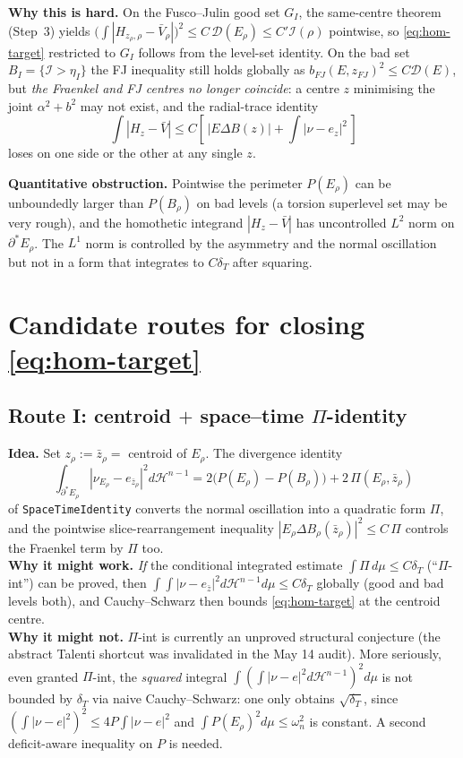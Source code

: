\documentclass[11pt]{article}
\theoremstyle{definition}
\newcommand{\Hn}{\mathcal H^{n-1}}
\newcommand{\dD}{\mathcal D}
\begin{document}
\textbf{Why this is hard.}  On the Fusco--Julin good set $G_{I}$, the
same-centre theorem (Step~3) yields
$\bigl(\int|H_{z_{\rho},\rho}-\bar V_{\rho}|\bigr)^{2}\le C\,\dD(E_{\rho})\le C'\mathcal I(\rho)$
pointwise, so \eqref{eq:hom-target} restricted to $G_{I}$ follows from
the level-set identity.  On the bad set
$B_{I}=\{\mathcal I>\eta_{I}\}$ the FJ inequality still holds
globally as $b_{FJ}(E,z_{FJ})^{2}\le C\dD(E)$, but \emph{the
Fraenkel and FJ centres no longer coincide}: a centre $z$ minimising
the joint $\alpha^{2}+b^{2}$ may not exist, and the radial-trace
identity
\[
   \int|H_{z}-\bar V|\le C[\,|E\Delta B(z)|+\int|\nu-e_{z}|^{2}\,]
\]
loses on one side or the other at any single $z$.

\textbf{Quantitative obstruction.}  Pointwise the perimeter
$P(E_{\rho})$ can be unboundedly larger than $P(B_{\rho})$ on bad
levels (a torsion superlevel set may be very rough), and the
homothetic integrand $|H_{z}-\bar V|$ has uncontrolled $L^{2}$ norm
on $\partial^{*}E_{\rho}$.  The $L^{1}$ norm is controlled by the
asymmetry and the normal oscillation but not in a form that integrates
to $C\delta_{T}$ after squaring.

\section{Candidate routes for closing \eqref{eq:hom-target}}\label{sec:fixes}

\subsection{Route I: centroid $+$ space--time $\Pi$-identity}
\label{ssec:routeI}

\textbf{Idea.}  Set $z_{\rho}:=\bar z_{\rho}=$ centroid of $E_{\rho}$.
The divergence identity
\[
   \int_{\partial^{*}E_{\rho}}|\nu_{E_{\rho}}-e_{\bar z_{\rho}}|^{2}d\Hn
   =2\bigl(P(E_{\rho})-P(B_{\rho})\bigr)+2\,\Pi(E_{\rho},\bar z_{\rho})
\]
of \texttt{SpaceTimeIdentity} converts the normal oscillation into
a quadratic form $\Pi$, and the pointwise slice-rearrangement
inequality $|E_{\rho}\Delta B_{\rho}(\bar z_{\rho})|^{2}\le C\,\Pi$
controls the Fraenkel term by $\Pi$ too.\\
\textbf{Why it might work.}  \emph{If} the conditional integrated
estimate $\int\Pi\,d\mu\le C\delta_{T}$ (``$\Pi$-int'') can be proved,
then $\int\int|\nu-e_{\bar z}|^{2}d\Hn d\mu\le C\delta_{T}$ globally
(good and bad levels both), and Cauchy--Schwarz then bounds
\eqref{eq:hom-target} at the centroid centre.\\
\textbf{Why it might not.}  $\Pi$-int is currently an unproved
structural conjecture (the abstract Talenti shortcut was invalidated
in the May 14 audit).  More seriously, even granted $\Pi$-int, the
\emph{squared} integral $\int(\int|\nu-e|^{2}d\Hn)^{2}d\mu$ is not
bounded by $\delta_{T}$ via naive Cauchy--Schwarz: one only obtains
$\sqrt{\delta_{T}}$, since
$(\int|\nu-e|^{2})^{2}\le 4P\int|\nu-e|^{2}$ and
$\int P(E_{\rho})^{2}d\mu\le\omega_{n}^{2}$ is constant.  A second
deficit-aware inequality on $P$ is needed.
\end{document}
